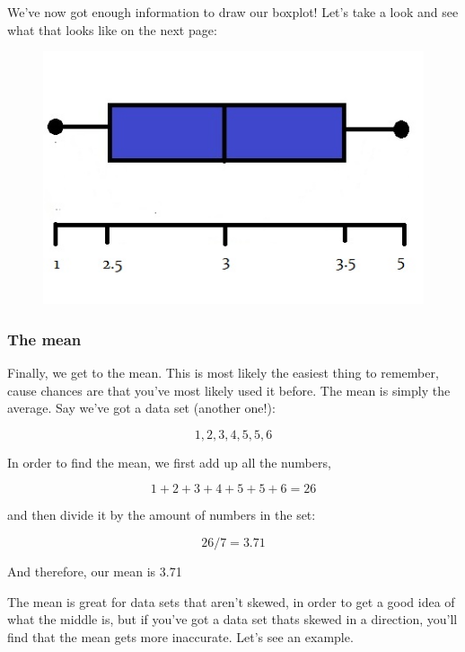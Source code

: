 \documentclass[11pt]{article}
\begin{document}
We've now got enough information to draw our boxplot! Let's take a look and see what that looks like on the next page:

\clearpage{}
\begin{figure}[htp]
\centering
\includegraphics[scale=1.00]{IQRCompleteImage8.jpg}
\end{figure}

\subsubsection*{The mean}
Finally, we get to the mean. This is most likely the easiest thing to remember, cause chances are that you've most likely used it before. The mean is simply the average. Say we've got a data set (another one!):

\begin{displaymath}
1, 2, 3, 4, 5, 5, 6
\end{displaymath}

In order to find the mean, we first add up all the numbers,

\begin{displaymath}
1 + 2 + 3 + 4 + 5 + 5 + 6 = 26
\end{displaymath}

and then divide it by the amount of numbers in the set:

\begin{displaymath}
26/7 = 3.71
\end{displaymath}

And therefore, our mean is 3.71

The mean is great for data sets that aren't skewed, in order to get a good idea of what the middle is, but if you've got a data set thats skewed in a direction, you'll find that the mean gets more inaccurate. Let's see an example.
\end{document}
